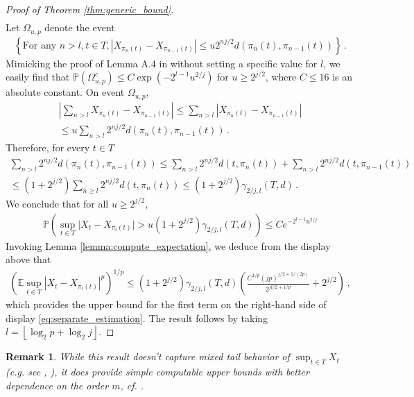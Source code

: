 \documentclass[12pt]{article}
\renewcommand{\exp}[1]{\operatorname{exp}\left(#1\right)} %
\def\l{\left}
\def\r{\right}
\newcommand{\mb}{\mathbb}
\theoremstyle{thmstyletwo}%
\newtheorem{remark}{Remark}%
\theoremstyle{thmstylethree}%
\begin{document}
\begin{proof}[Proof of Theorem \ref{thm:generic_bound}]
\begin{align*}
    \end{align*}
    Let $\Omega_{u, p}$ denote the event
    \begin{align*}
        \l\{\text{For any }n > l, t\in T, \l\lvert X_{\pi_n(t)} - X_{\pi_{n-1}(t)} \r\rvert \leq u2^{nj/2}d(\pi_{n}(t), \pi_{n-1}(t))  \r\}\,.
    \end{align*}
    Mimicking the proof of Lemma A.4 in \cite{dirksen2015tail} without setting a specific value for $l$, we easily find that $\mb P \l(\Omega_{u,p}^c\r) \leq C\exp{-2^{l-1}u^{2/j}}$ for $u \geq 2^{j/2}$, where $C \leq 16$ is an absolute constant. On event $\Omega_{u,p}$,
    \begin{multline*}
        \l\lvert \sum_{n > l} X_{\pi_n(t)} - X_{\pi_{n-1}(t)} \r\rvert \leq \sum_{n > l} \l\lvert X_{\pi_n(t)} - X_{\pi_{n-1}(t)} \r\rvert \\
        \leq u \sum_{n > l}2^{nj/2} d(\pi_n(t), \pi_{n-1}(t))\,.
    \end{multline*}
    Therefore, for every $t\in T$
    \begin{multline*}
        \sum_{n > l}2^{nj/2} d(\pi_n(t), \pi_{n-1}(t)) \leq \sum_{n > l} 2^{nj/2}d(t, \pi_n(t)) + \sum_{n > l} 2^{nj/2}d(t, \pi_{n-1}(t)) \\
        \leq (1 + 2^{j/2}) \sum_{n \geq l} 2^{nj/2} d(t, \pi_n(t)) \leq \l(1 + 2^{j/2}\r) \gamma_{2/j, l}(T, d)\,.
    \end{multline*}
    We conclude that for all $u \geq 2^{j/2}$,
    \begin{align*}
        \mb P \l(\sup_{t\in T} \lvert X_t - X_{\pi_l(t)} \rvert > u(1 + 2^{j/2})\gamma_{2/j, l}(T, d) \r) \leq C e^{-2^{l-1}u^{2/j}}
    \end{align*}
    Invoking Lemma \ref{lemma:compute_expectation}, we deduce from the display above that
    \begin{align*}
        \l(\mb E \sup_{t\in T} \l\lvert X_t - X_{\pi_l(t)}\r\rvert^p\r)^{1/p} \leq \l(1 + 2^{j/2}\r) \gamma_{2/j, l}(T, d)\l(\frac{C^{1/p} (jp)^{j/2 + 1/(2p)}}{2^{jl/2 + 1/p}} + 2^{j/2}\r)\,,
    \end{align*}
    which provides the upper bound for the first term on the right-hand side of display \eqref{eq:separate_estimation}. The result follows by taking $l = \l\lfloor \log_2 p + \log_2 j \r\rfloor$.

\end{proof}
\begin{remark}
     While this result doesn't capture mixed tail behavior of $\sup_{t\in T}X_t$ (e.g. see \citep[Theorem 14]{boucheron2005moment}, \cite{adamczak2006moment}), it does provide simple \emph{computable} upper bounds with better dependence on the order $m$, cf. \cite[Corollary 5]{boucheron2005moment}. 
\end{remark}
\end{document}
